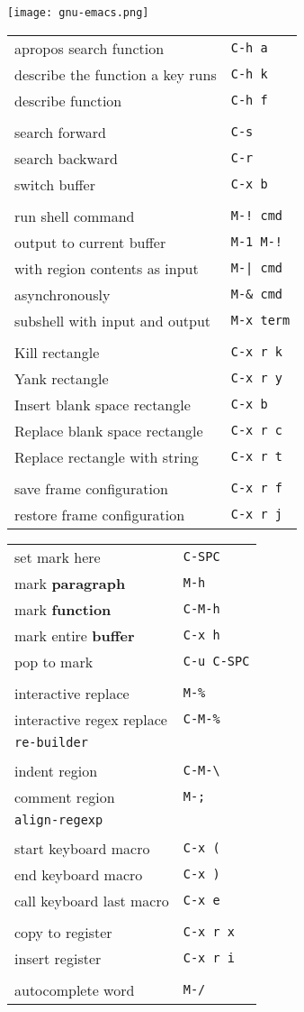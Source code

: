 \documentclass{minimal}
\begin{document}
\begin{multicols}{3}
\vspace*{\fill}
\begin{center}
\texttt{[image: gnu-emacs.png]}
\end{center}
\vspace*{\fill}
\columnbreak
\fontsize{6pt}{7pt}\selectfont

\fontsize{8pt}{9pt}\selectfont

\def\key#1#2{#1 & \texttt{#2} \\}


\begin{tabular}{ p{1.95in} p{.5in} }
\key{apropos search function}{C-h a}
\key{describe the function a key runs}{C-h k}
\key{describe function}{C-h f}
&\\
\key{search forward}{C-s}
\key{search backward}{C-r}
\key{switch buffer}{C-x b}
&\\
\key{run shell command}{M-!~cmd}
\key{output to current buffer}{M-1 M-!}
\key{with region contents as input}{M-|~cmd}
\key{asynchronously}{M-\&~cmd}
\key{subshell with input and output}{M-x~term}
&\\
\key{Kill rectangle}{C-x r k}
\key{Yank rectangle}{C-x r y}
\key{Insert blank space rectangle}{C-x b}
\key{Replace blank space rectangle}{C-x r c}
\key{Replace rectangle with string}{C-x r t}
&\\
\key{save frame configuration}{C-x r f}
\key{restore frame configuration}{C-x r j}
\end{tabular}
\begin{tabular}{ p{1.8in} p{.7in} }
\key{set mark here}{C-SPC}
\key{mark \textbf{paragraph}}{M-h}
\key{mark \textbf{function}}{C-M-h}
\key{mark entire \textbf{buffer}}{C-x h}
\key{pop to mark}{C-u C-SPC}
&\\
\key{interactive replace }{M-\%}
\key{interactive regex replace}{C-M-\%}
\key{\texttt{re-builder}}{}
&\\
\key{indent region}{C-M-\textbackslash}
\key{comment region}{M-;}
\key{\texttt{align-regexp}}{}
&\\
\key{start keyboard macro}{C-x (}
\key{end keyboard macro}{C-x )}
\key{call keyboard last macro}{C-x e}
&\\
\key{copy to register}{C-x r x}
\key{insert register}{C-x r i}
&\\
\key{autocomplete word}{M-/}
\end{tabular}
\end{multicols}
\end{document}
